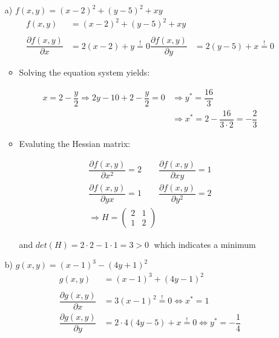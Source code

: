 \documentclass[12pt,a4paper]{article}
\begin{document}
\begin{itemize}
    \item[a)] $f(x,y) = (x -2)^2 + (y -5)^2 + xy$
    \begin{align*}
      f(x,y) & = (x -2)^2 + (y - 5)^2 + xy\\
      & \\
      \dfrac{\partial f(x,y)}{\partial x} & = 2(x -2) + y \overset{!}{=} 0
      \dfrac{\partial f(x,y)}{\partial y} & = 2(y -5) + x \overset{!}{=} 0 
    \end{align*}
    \begin{itemize}
      \item Solving the equation system yields:
    \end{itemize}
    \begin{align*}
      x = 2 -\dfrac{y}{2} \Rightarrow 2y - 10 + 2 - \dfrac{y}{2} = 0 &\Rightarrow y^{*} = \dfrac{16}{3} \\
      &\Rightarrow x^{*} = 2 -\dfrac{16}{3 \cdot 2} = - \dfrac{2}{3}
    \end{align*}
    \begin{itemize}
      \item Evaluting the Hessian matrix:
    \end{itemize}
    \begin{align*}
      \dfrac{\partial f(x,y)}{\partial x^2} = 2 \qquad  \dfrac{\partial f(x,y)}{\partial xy} = 1 \\
      \dfrac{\partial f(x,y)}{\partial yx} = 1  \qquad  \dfrac{\partial f(x,y)}{\partial y^2} = 2\\
      \Rightarrow H = 
      \begin{pmatrix}
        2 & 1 \\
        1 & 2
      \end{pmatrix}
    \end{align*}
    \begin{itemize}
      \item[] and $det(H) = 2 \cdot 2 - 1 \cdot 1 = 3 > 0 \;$ which indicates a minimum
    \end{itemize}
    \item[b)] $g(x,y) = (x -1)^3 - (4y + 1)^2$
    \begin{align*}
      g(x,y) & = (x -1)^3 + (4y - 1)^2\\
      & \\
      \dfrac{\partial g(x,y)}{\partial x} & = 3(x - 1)^2 \overset{!}{=} 0 \Leftrightarrow x^{*} = 1 \\
      \dfrac{\partial g(x,y)}{\partial y} & = 2 \cdot 4(4y -5) + x \overset{!}{=} 0 \Leftrightarrow y^{*} = - \dfrac{1}{4} 

\end{align*}
\end{itemize}
\end{document}

